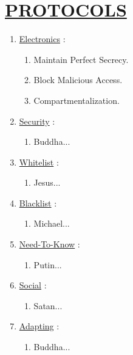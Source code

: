 \documentclass[11pt]{article}
\begin{document}
\section*{\ul{PROTOCOLS}}
\begin{enumerate}
	\item[] \ul{Electronics} :
	\begin{enumerate}
		\item[] Maintain Perfect Secrecy.
		\item[] Block Malicious Access.
		\item[] Compartmentalization.
	\end{enumerate}

	\item[] \ul{Security} :
	\begin{enumerate}
		\item[] Buddha...
	\end{enumerate}

	\item[] \ul{Whitelist} :
	\begin{enumerate}
		\item[] Jesus...
	\end{enumerate}
	
	\item[] \ul{Blacklist} :
	\begin{enumerate}
		\item[] Michael...
	\end{enumerate}

	\item[] \ul{Need-To-Know} :
	\begin{enumerate}
		\item[] Putin...
	\end{enumerate}

	\item[] \ul{Social}  :
	\begin{enumerate}
		\item[] Satan...
	\end{enumerate}

	\item[] \ul{Adapting} :
	\begin{enumerate}
		\item[] Buddha...
	\end{enumerate}
\end{enumerate}
\end{document}
